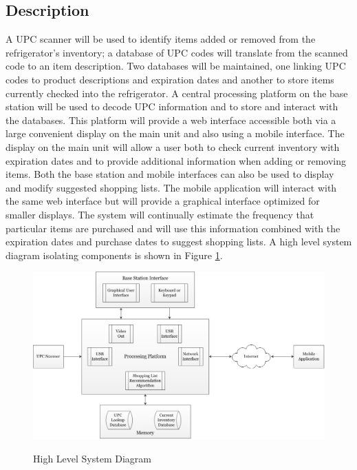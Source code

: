 \documentclass[11pt]{article} %
\begin{document}
\subsection{Description}
A UPC scanner will be used to identify items added or removed from the refrigerator's inventory; a database of UPC codes will translate from the scanned code to an item description. Two databases will be maintained, one linking UPC codes to product descriptions and expiration dates and another to store items currently checked into the refrigerator. A central processing platform on the base station will be used to decode UPC information and to store and interact with the databases. This platform will provide a web interface accessible both via a large convenient display on the main unit and also using a mobile interface. The display on the main unit will allow a user both to check current inventory with expiration dates and to provide additional information when adding or removing items. Both the base station and mobile interfaces can also be used to display and modify suggested shopping lists. The mobile application will interact with the same web interface but will provide a graphical interface optimized for smaller displays. The system will continually estimate the frequency that particular items are purchased and will use this information combined with the expiration dates and purchase dates to suggest shopping lists.
\newline \quad \newline
A high level system diagram isolating components is shown in Figure \ref{fig:sysdiag}.
\begin{figure}[h]
\begin{center}
\vspace{0.5cm}
\caption{High Level System Diagram}
\includegraphics[scale=0.5]{SmartFridgeTopLevel}
\label{fig:sysdiag}
\end{center}
\end{figure}
\pagebreak
\end{document}
